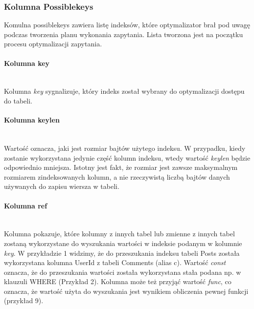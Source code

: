 \subsubsection{Kolumna Possible\textunderscore keys}
Komulna possible\textunderscore keys zawiera listę indeksów, które optymalizator brał pod uwagę podczas tworzenia planu wykonania zapytania. Lista tworzona jest na początku procesu optymalizacji zapytania.

\paragraph{Kolumna key}\leavevmode\\
Kolumna \textit{key} sygnalizuje, który indeks został wybrany do optymalizacji dostępu do tabeli.

\paragraph{Kolumna key\textunderscore len}\leavevmode\\
Wartość oznacza, jaki jest rozmiar bajtów użytego indeksu. W przypadku, kiedy zostanie wykorzystana jedynie część kolumn indeksu, wtedy wartość \textit{key\textunderscore len} będzie odpowiednio mniejsza. Istotny jest fakt, że rozmiar jest zawsze maksymalnym rozmiarem zindeksowanych kolumn, a nie rzeczywistą liczbą bajtów danych używanych do zapisu wiersza w tabeli.

\paragraph{Kolumna ref}\leavevmode\\
Kolumna pokazuje, które kolumny z innych tabel lub zmienne z innych tabel zostaną wykorzystane do wyszukania wartości w indeksie podanym w kolumnie \textit{key}. W przykładzie 1 widzimy, że do przeszukania indeksu tabeli Posts została wykorzystana kolumna UserId z tabeli Comments (alias c). Wartość \textit{const} oznacza, że do przeszukania wartości została wykorzystana stała podana np. w klauzuli WHERE (Przykład 2). Kolumna może też przyjąć wartość \textit{func}, co oznacza, że wartość użyta do wyszukania jest wynikiem obliczenia pewnej funkcji (przykład 9).

